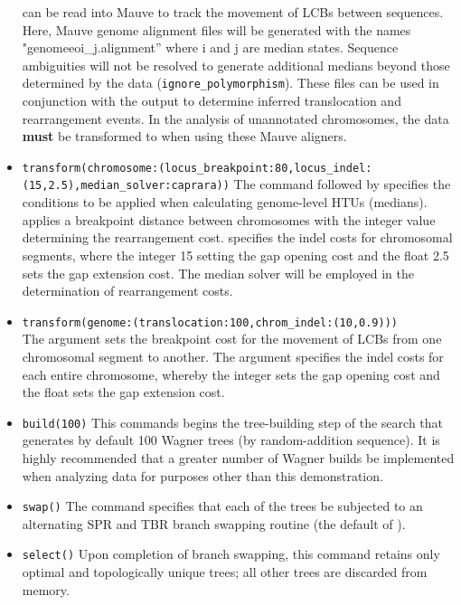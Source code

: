 \begin{itemize}
can be read into Mauve to track the movement of LCBs between sequences. Here, Mauve genome alignment files will be generated 
with the names "genomeeoi\_j.alignment'' where i and j are median states. Sequence ambiguities will not be resolved to generate 
additional medians beyond those determined by the data (\texttt{ignore\_polymorphism}). These files can be used in 
conjunction with the  output to determine inferred translocation and rearrangement events. 
In the analysis of unannotated chromosomes, the data {\bf must} be transformed to 
when using these Mauve aligners.
\item \texttt{transform(chromosome:(locus\_breakpoint:80,locus\_indel:\\(15,2.5),median\_solver:caprara))}  The command 
 followed by  specifies the conditions to be 
applied when calculating genome-level HTUs (medians).  
applies a breakpoint distance between chromosomes with the integer value determining the rearrangement cost. 
 specifies the indel costs for chromosomal segments, where the integer 15 
setting the gap opening cost and the float 2.5 sets the gap extension cost. The median solver 
will be employed in the determination of rearrangement costs.
\item \texttt{transform(genome:(translocation:100,chrom\_indel:(10,0.9)))} \\ The argument  
sets the breakpoint cost for the movement of LCBs from one chromosomal segment to another. The 
argument  specifies the indel costs for each entire chromosome, whereby the 
integer sets the gap opening cost and the float sets the gap extension cost.  
\item \texttt{build(100)} This commands begins the tree-building step of the search that generates by default 100 Wagner trees 
(by random-addition sequence).  It is highly recommended that a greater number of Wagner builds be implemented when analyzing 
data for purposes other than this demonstration.
\item \texttt{swap()} The  command specifies that each of the trees be subjected to an alternating 
SPR and TBR branch swapping routine (the default of \poy).
\item \texttt{select()} Upon completion of branch swapping, this command retains only optimal and topologically 
unique trees; all other trees are discarded from memory.

\end{itemize}

